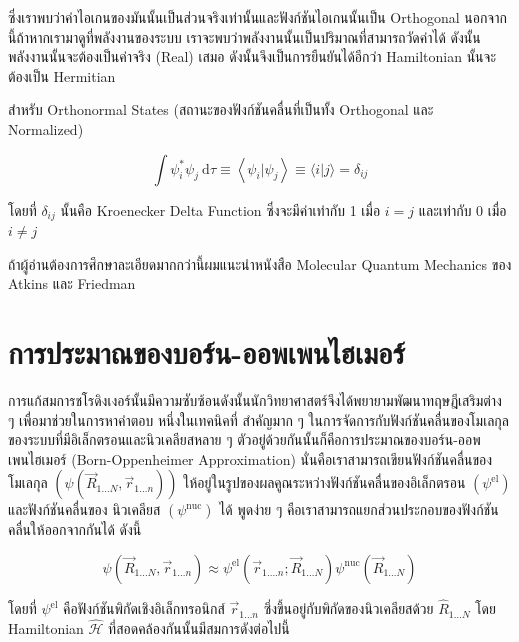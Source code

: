 \noindent ซึ่งเราพบว่าค่าไอเกนของมันนั้นเป็นส่วนจริงเท่านั้นและฟังก์ชันไอเกนนั้นเป็น Orthogonal นอกจากนี้ถ้าหากเรามาดูที่พลังงานของระบบ%
เราจะพบว่าพลังงานนั้นเป็นปริมาณที่สามารถวัดค่าได้ ดังนั้นพลังงานนั้นจะต้องเป็นค่าจริง (Real) เสมอ ดังนั้นจึงเป็นการยืนยันได้อีกว่า Hamiltonian 
นั้นจะต้องเป็น Hermitian 

สำหรับ Orthonormal States (สถานะของฟังก์ชันคลื่นที่เป็นทั้ง Orthogonal และ Normalized)

\begin{equation}
    \int \psi_i^* \psi_j \mathrm{~d} \tau 
    \equiv 
    \left\langle\psi_i | \psi_j\right\rangle 
    \equiv 
    \langle i | j\rangle=\delta_{i j}
\end{equation}

\noindent โดยที่ $\delta_{i j}$ นั้นคือ Kroenecker Delta Function ซึ่งจะมีค่าเท่ากับ 1 เมื่อ $i=j$ และเท่ากับ 0 เมื่อ $i \neq j$

ถ้าผู้อ่านต้องการศึกษาละเอียดมากกว่านี้ผมแนะนำหนังสือ Molecular Quantum Mechanics ของ Atkins และ Friedman

\section{การประมาณของบอร์น-ออพเพนไฮเมอร์}

การแก้สมการชโรดิงเงอร์นั้นมีความซับซ้อนดังนั้นนักวิทยาศาสตร์จึงได้พยายามพัฒนาทฤษฎีเสริมต่าง ๆ เพื่อมาช่วยในการหาคำตอบ หนึ่งในเทคนิคที่%
สำคัญมาก ๆ ในการจัดการกับฟังก์ชันคลื่นของโมเลกุลของระบบที่มีอิเล็กตรอนและนิวเคลียสหลาย ๆ ตัวอยู่ด้วยกันนั้นก็คือการประมาณของบอร์น-ออพเพนไฮเมอร์ 
(Born-Oppenheimer Approximation) นั่นคือเราสามารถเขียนฟังก์ชันคลื่นของโมเลกุล $(\psi\left(\vec{R}_{1 \ldots N}, 
\vec{r}_{1 \ldots n}\right))$ ให้อยู่ในรูปของผลคูณระหว่างฟังก์ชันคลื่นของอิเล็กตรอน $(\psi^{\mathrm{el}})$ และฟังก์ชันคลื่นของ%
นิวเคลียส $(\psi^{\text{nuc}})$ ได้ พูดง่าย ๆ คือเราสามารถแยกส่วนประกอบของฟังก์ชันคลื่นให้ออกจากกันได้ ดังนี้

\begin{equation}
    \psi\left(\vec{R}_{1 \ldots N}, \vec{r}_{1 \ldots n}\right) 
    \approx 
    \psi^{\mathrm{el}}\left(\vec{r}_{1 \ldots . n} ; \vec{R}_{1 \ldots N}\right) 
        \psi^{\mathrm{nuc}}\left(\vec{R}_{1 \ldots N}\right)
\end{equation}

\noindent โดยที่ $\psi^{\mathrm{el}}$ คือฟังก์ชันพิกัดเชิงอิเล็กทรอนิกส์ $\vec{r}_{1 \ldots n}$ ซึ่งขึ้นอยู่กับพิกัดของนิวเคลียสด้วย 
$\hat{R}_{1 \ldots N}$ โดย Hamiltonian $\hat{\mathscr{H}}$ ที่สอดคล้องกันนั้นมีสมการดังต่อไปนี้

